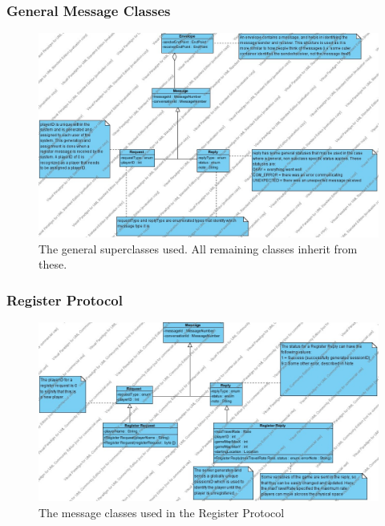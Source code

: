 \documentclass[12pt]{article}
\begin{document}
			\subsubsection{General Message Classes}
				\begin{center}
					\begin{figure}[htp]
						\centering
						\includegraphics[width=\textwidth]{Diagrams/Class Diagrams/Message Classes.jpg}
						\caption{The general superclasses used. All remaining classes inherit from these.}
					\end{figure}
				\end{center}
			\newpage
			\subsubsection{Register Protocol}
				\begin{center}
					\begin{figure}[htp]
						\centering
						\includegraphics[width=\textwidth]{Diagrams/Class Diagrams/Register Protocol.jpg}
						\caption{The message classes used in the Register Protocol}
					\end{figure}
				\end{center}
			\newpage
\end{document}
